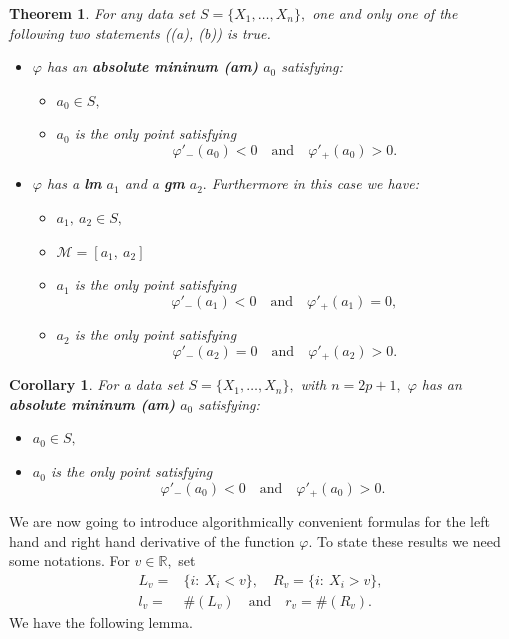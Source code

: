 \documentclass[
  11pt,
  a4paper,
]{article}
\newcommand\R{{\mathbb R}}
\newtheorem{theorem}{Theorem}
\newtheorem{corollary}{Corollary}
\begin{document}
\begin{theorem} For any data set $S=\{X_1,\ldots,X_n\},$ one and only one of the following two statements  ((a), (b)) is true.
	\begin{itemize}
		\item[(a)] $\varphi$ has an \textbf{absolute mininum (am)} $a_0$ satisfying:
		\begin{itemize}
			\item[(i)] $a_0\in S,$
			\item[(ii)] $a_0$ is the only point satisfying
			\[
			\varphi'_-(a_0)<0 \quad\text{and}\quad \varphi'_+(a_0)>0.
			\]
		\end{itemize}	  
		\item[(b)] $\varphi$ has a \textbf{lm} $a_1$    and a \textbf{gm} $a_2.$ Furthermore
		in this case we have:
		\begin{itemize}
			\item[(i)] $a_1,\ a_2\in S,$
			\item[(ii)] $\mathscr{M}=[a_1,\ a_2]$
			
			\item[(iii)] $a_1$ is the only point satisfying
			\[
			\varphi'_-(a_1)<0 \quad\text{and}\quad \varphi'_+(a_1)=0,
			\]
			\item[(iv)] $a_2$ is the only point satisfying
			\[
			\varphi'_-(a_2)=0 \quad\text{and}\quad \varphi'_+(a_2)>0.
			\]
		\end{itemize}	 
	\end{itemize}	
	
\end{theorem} 


\begin{corollary}  For a data set $S=\{X_1,\ldots,X_n\},$  with $n=2p+1,$
	$\varphi$ has an \textbf{absolute mininum (am)} $a_0$ satisfying:
	\begin{itemize}
		\item[(i)] $a_0\in S,$
		\item[(ii)] $a_0$ is the only point satisfying
		\[
		\varphi'_-(a_0)<0 \quad\text{and}\quad \varphi'_+(a_0)>0.
		\]
	\end{itemize}	
\end{corollary}





We are now going to introduce algorithmically convenient formulas for the left hand and right hand derivative
of the function $\varphi.$ To state these results we need some notations. For $v\in \R,$ set
\begin{align*}
	L_v= &\{i:\  X_i<v\},\quad R_v=\{i:\  X_i>v\},\\
	l_v= &\#(L_v)\quad \text{and}\quad r_v= \#(R_v).
\end{align*}
We have the following lemma.
\end{document}
